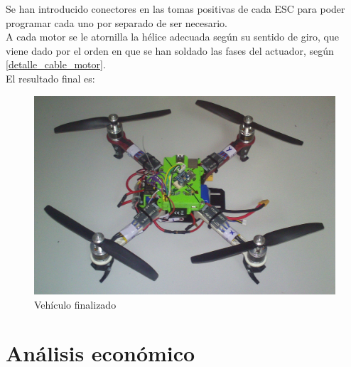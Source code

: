 \documentclass[twoside,11pt]{book}
\begin{document}
Se han introducido conectores en las tomas positivas de cada ESC para poder programar cada uno por separado de ser necesario. \\

A cada motor se le atornilla la hélice adecuada según su sentido de giro, que viene dado por el orden en que se han soldado las fases del actuador, según \ref{detalle_cable_motor}.\\

El resultado final es:

\begin{figure}[h!]
\begin{center}
\includegraphics[scale=0.19,bb=0 0 1600 1200]{images/qc_final.png}
\caption{Vehículo finalizado}
\end{center}
\end{figure}


\newpage

\chapter{Análisis económico} \label{economics}
\end{document}
